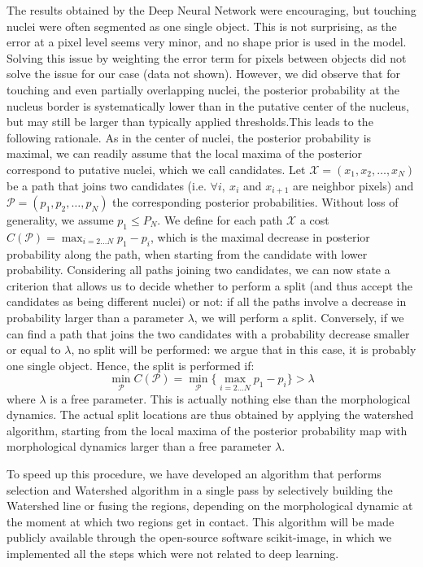 \documentclass{article}
\begin{document}
The results obtained by the Deep Neural Network were encouraging, but
touching nuclei were often segmented as one single object. This is not
surprising, as the error at a pixel level seems very minor, and no
shape prior is used in the model. Solving this issue by weighting the
error term for pixels between objects did not solve the issue for our
case (data not shown). However, we did observe that for touching and
even partially overlapping nuclei, the posterior probability at the
nucleus border is systematically lower than in
the putative center of the nucleus, but may still be larger than
typically applied thresholds.This leads to the following rationale. As in the center of nuclei, the
posterior probability is maximal, we can readily assume that the local
maxima of the posterior correspond to putative nuclei, which we call candidates. Let
$\mathcal{X}=(x_1,x_2,\ldots,x_N)$ be a path that joins two candidates
(i.e. $\forall i, \ x_i$ and $x_{i+1}$ are neighbor pixels) and
$\mathcal{P}=(p_1,p_2,\ldots,p_N)$ the corresponding posterior
probabilities. Without loss of generality, we assume $p_1\leq P_N$.
We define for each path $\mathcal{X}$ a cost
$C(\mathcal{P})=\max_{i=2 \ldots N}{p_1-p_i}$, which is the maximal
decrease in posterior probability along the path, when starting from
the candidate with lower probability.  Considering all paths joining two
candidates, we can now state a criterion that allows us to decide whether to
perform a split (and thus accept the candidates as being different
nuclei) or not: if all the paths involve a decrease in probability
larger than a parameter $\lambda$, we will perform a
split. Conversely, if we can find a path that joins the two candidates
with a probability decrease smaller or equal to $\lambda$, no split
will be performed: we argue that in this case, it is probably one
single object. Hence, the split is performed if: 
\begin{equation}
\min_{\mathcal{P}}C(\mathcal{P}) = \min_{\mathcal{P}} \{\max_{i=2
  \ldots N}{p_1-p_i}\} > \lambda
\end{equation}
where $\lambda$ is a free parameter. This is actually nothing else
than the morphological dynamics\cite{Grimaud1992}. The actual split
locations are thus obtained by applying the watershed algorithm,
starting from the local maxima of the posterior probability map with
morphological dynamics larger than a free parameter $\lambda$. 

To speed up this procedure, we have developed an algorithm that
performs selection and Watershed algorithm in a single pass by
selectively building the Watershed line or fusing the regions,
depending on the morphological dynamic at the moment at which two
regions get in contact. This algorithm will be made publicly available
through the open-source software scikit-image\cite{scikit-image}, in which we implemented
all the steps which were not related to deep learning. 
\end{document}
